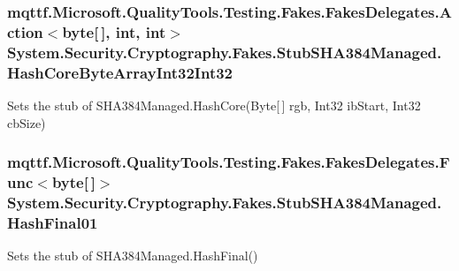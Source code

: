 \hypertarget{class_system_1_1_security_1_1_cryptography_1_1_fakes_1_1_stub_s_h_a384_managed_a6cb567c52f6180ad62efa2d4a14d6e2a}{
\subsubsection[{Hash\-Core\-Byte\-Array\-Int32\-Int32}]{\setlength{\rightskip}{0pt plus 5cm}mqttf.\-Microsoft.\-Quality\-Tools.\-Testing.\-Fakes.\-Fakes\-Delegates.\-Action$<$byte\mbox{[}$\,$\mbox{]}, int, int$>$ System.\-Security.\-Cryptography.\-Fakes.\-Stub\-S\-H\-A384\-Managed.\-Hash\-Core\-Byte\-Array\-Int32\-Int32}}\label{class_system_1_1_security_1_1_cryptography_1_1_fakes_1_1_stub_s_h_a384_managed_a6cb567c52f6180ad62efa2d4a14d6e2a}


Sets the stub of S\-H\-A384\-Managed.\-Hash\-Core(\-Byte\mbox{[}$\,$\mbox{]} rgb, Int32 ib\-Start, Int32 cb\-Size)

\hypertarget{class_system_1_1_security_1_1_cryptography_1_1_fakes_1_1_stub_s_h_a384_managed_a8b5422ea8f27f704a3be6a5dd42308ba}{
\subsubsection[{Hash\-Final01}]{\setlength{\rightskip}{0pt plus 5cm}mqttf.\-Microsoft.\-Quality\-Tools.\-Testing.\-Fakes.\-Fakes\-Delegates.\-Func$<$byte\mbox{[}$\,$\mbox{]}$>$ System.\-Security.\-Cryptography.\-Fakes.\-Stub\-S\-H\-A384\-Managed.\-Hash\-Final01}}\label{class_system_1_1_security_1_1_cryptography_1_1_fakes_1_1_stub_s_h_a384_managed_a8b5422ea8f27f704a3be6a5dd42308ba}


Sets the stub of S\-H\-A384\-Managed.\-Hash\-Final()

